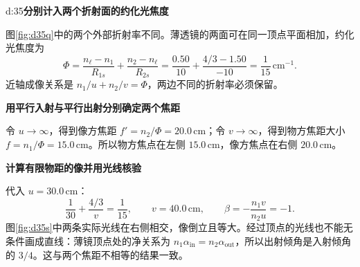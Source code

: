 \begin{drillsolution}{d:35}\textbf{分别计入两个折射面的约化光焦度}\par\nobreak
图\ref{fig:d35q}中的两个外部折射率不同。薄透镜的两面可在同一顶点平面相加，约化光焦度为
\[
\Phi=\frac{n_\ell-n_1}{R_{1s}}+\frac{n_2-n_\ell}{R_{2s}}
=\frac{0.50}{10}+\frac{4/3-1.50}{-10}
=\frac1{15}\,\mathrm{cm}^{-1}.
\]
近轴成像关系是 $n_1/u+n_2/v=\Phi$，两边不同的折射率必须保留。

\par\medskip{}\noindent\textbf{用平行入射与平行出射分别确定两个焦距}\par\nobreak
令 $u\to\infty$，得到像方焦距 $f'=n_2/\Phi=20.0\,\mathrm{cm}$；令 $v\to\infty$，得到物方焦距大小 $f=n_1/\Phi=15.0\,\mathrm{cm}$。所以物方焦点在左侧 $15.0\,\mathrm{cm}$，像方焦点在右侧 $20.0\,\mathrm{cm}$。

\par\medskip{}\noindent\textbf{计算有限物距的像并用光线核验}\par\nobreak
代入 $u=30.0\,\mathrm{cm}$：
\[
\frac1{30}+\frac{4/3}{v}=\frac1{15},\qquad
\boxed{v=40.0\,\mathrm{cm}},\qquad
\boxed{\beta=-\frac{n_1v}{n_2u}=-1}.
\]
图\ref{fig:d35s}中两条实际光线在右侧相交，像倒立且等大。经过顶点的光线也不能无条件画成直线：薄镜顶点处的净关系为 $n_1\alpha_{\mathrm{in}}=n_2\alpha_{\mathrm{out}}$，所以出射倾角是入射倾角的 $3/4$。这与两个焦距不相等的结果一致。
\end{drillsolution}
